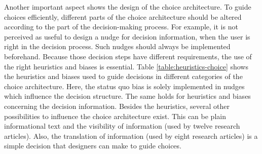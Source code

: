 Another important aspect shows the design of the choice architecture. To guide choices efficiently, different parts of the choice architecture should be altered according to the part of the decision-making process. For example, it is not perceived as useful to design a nudge for decision information, when the user is right in the decision process. Such nudges should always be implemented beforehand. Because those decision steps have different requirements, the use of the right heuristics and biases is essential. Table \ref{table:heuristics-choice} shows the heuristics and biases used to guide decisions in different categories of the choice architecture. Here, the status quo bias is solely implemented in nudges which influence the decision structure. The same holds for heuristics and biases concerning the decision information. Besides the heuristics, several other possibilities to influence the choice architecture exist. This can be plain informational text and the visibility of information (used by twelve research articles). Also, the translation of information (used by eight research articles) is a simple decision that designers can make to guide choices. 
\\

